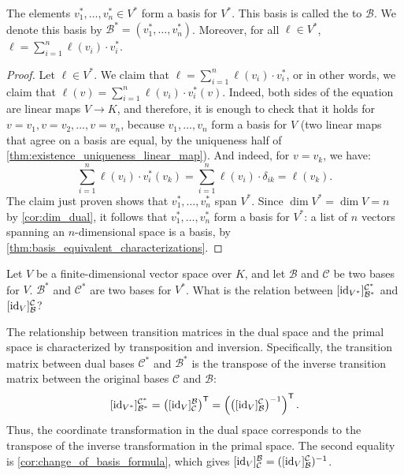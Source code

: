 \begin{lemma}
  \label{lem:dual_basis}
  The elements $v_1^*, \dots, v_n^* \in V^*$ form a basis for $V^*$. This basis is called the  to $\mathcal{B}$. We denote this basis by $\mathcal{B}^* = (v_1^*, \dots, v_n^*)$. Moreover, for all $\ell \in V^*$, $\ell = \sum_{i=1}^n \ell(v_i) \cdot v_i^*$.
\end{lemma}

\begin{proof}
  Let $\ell \in V^*$. We claim that $\ell = \sum_{i=1}^n \ell(v_i) \cdot v_i^*$, or in other words, we claim that $\ell(v) = \sum_{i=1}^n \ell(v_i) \cdot v_i^*(v)$. Indeed, both sides of the equation are linear maps $V \to K$, and therefore, it is enough to check that it holds for $v = v_1, v = v_2, \dots, v = v_n$, because $v_1, \dots, v_n$ form a basis for $V$ (two linear maps that agree on a basis are equal, by the uniqueness half of \cref{thm:existence_uniqueness_linear_map}). And indeed, for $v = v_k$, we have:
  \[ \sum_{i=1}^n \ell(v_i) \cdot v_i^*(v_k) = \sum_{i=1}^n \ell(v_i) \cdot \delta_{ik} = \ell(v_k). \]
  The claim just proven shows that $v_1^*, \dots, v_n^*$ span $V^*$. Since $\dim V^* = \dim V = n$ by \cref{cor:dim_dual}, it follows that $v_1^*, \dots, v_n^*$ form a basis for $V^*$: a list of $n$ vectors spanning an $n$-dimensional space is a basis, by \cref{thm:basis_equivalent_characterizations}.
\end{proof}

\begin{question}Let $V$ be a finite-dimensional vector space over $K$, and let $\mathcal{B}$ and $\mathcal{C}$ be two bases for $V$. $\mathcal{B}^*$ and $\mathcal{C}^*$ are two bases for $V^*$. What is the relation between $[\operatorname{id}_{V^*}]_{\mathcal{B}^*}^{\mathcal{C}^*}$ and $[\operatorname{id}_V]_{\mathcal{B}}^{\mathcal{C}}$?
\end{question}

\begin{proposition}
  \label{prop:dual_change_of_basis}
  The relationship between transition matrices in the dual space and the primal space is characterized by transposition and inversion. Specifically, the transition matrix between dual bases $\mathcal{C}^*$ and $\mathcal{B}^*$ is the transpose of the inverse transition matrix between the original bases $\mathcal{C}$ and $\mathcal{B}$:
  \[
  [\operatorname{id}_{V^*}]_{\mathcal{B}^*}^{\mathcal{C}^*} = \left( [\operatorname{id}_V]_{\mathcal{C}}^{\mathcal{B}} \right)^{\mathsf{T}} = \left( \left( [\operatorname{id}_V]_{\mathcal{B}}^{\mathcal{C}} \right)^{-1} \right)^{\mathsf{T}}.
  \]
  Thus, the coordinate transformation in the dual space corresponds to the transpose of the inverse transformation in the primal space. The second equality is \cref{cor:change_of_basis_formula}, which gives $[\operatorname{id}_V]_{\mathcal{C}}^{\mathcal{B}} = ([\operatorname{id}_V]_{\mathcal{B}}^{\mathcal{C}})^{-1}$.
\end{proposition}

